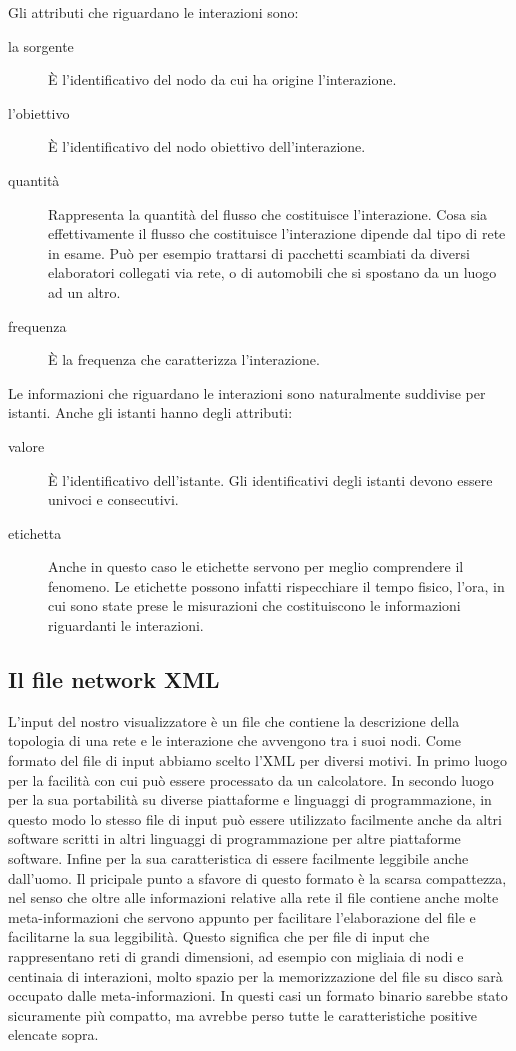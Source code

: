 \documentclass[a4paper,12pt]{article}
\begin{document}
Gli attributi che riguardano le interazioni sono:
\begin{description}
 \item[la sorgente] \`E l'identificativo del nodo da cui ha origine l'interazione.
 \item[l'obiettivo] \`E l'identificativo del nodo obiettivo dell'interazione.
 \item[quantità] Rappresenta la quantità del flusso che costituisce l'interazione. Cosa sia effettivamente il flusso che costituisce l'interazione dipende dal tipo di rete in esame. Pu\`o per esempio trattarsi di pacchetti scambiati da diversi elaboratori collegati via rete, o di automobili che si spostano da un luogo ad un altro.
 \item[frequenza] \`E la frequenza che caratterizza l'interazione.
\end{description}

Le informazioni che riguardano le interazioni sono naturalmente suddivise per istanti. Anche gli istanti hanno degli attributi:
\begin{description}
 \item[valore] \`E l'identificativo dell'istante. Gli identificativi degli istanti devono essere univoci e consecutivi.
 \item[etichetta] Anche in questo caso le etichette servono per meglio comprendere il fenomeno. Le etichette possono infatti rispecchiare il tempo fisico, l'ora, in cui sono state prese le misurazioni che costituiscono le informazioni riguardanti le interazioni.
\end{description}
 
\subsection{Il file network XML}
 
L'input del nostro visualizzatore \`e un file che contiene la descrizione della topologia di una rete e le interazione che avvengono tra i suoi nodi. Come formato del file di input abbiamo scelto l'XML per diversi motivi. In primo luogo per la facilità con cui pu\`o essere processato da un calcolatore. In secondo luogo per la sua portabilità su diverse piattaforme e linguaggi di programmazione, in questo modo lo stesso file di input pu\`o essere utilizzato facilmente anche da altri software scritti in altri linguaggi di programmazione per altre piattaforme software. Infine per la sua caratteristica di essere facilmente leggibile anche dall'uomo.
Il pricipale punto a sfavore di questo formato \`e la scarsa compattezza, nel senso che oltre alle informazioni relative alla rete il file contiene anche molte meta-informazioni che servono appunto per facilitare l'elaborazione del file e facilitarne la sua leggibilità. Questo significa che per file di input che rappresentano reti di grandi dimensioni, ad esempio con migliaia di nodi e centinaia di interazioni, molto spazio per la memorizzazione del file su disco sarà occupato dalle meta-informazioni. In questi casi un formato binario sarebbe stato sicuramente più compatto, ma avrebbe perso tutte le caratteristiche positive elencate sopra.
 
\end{document}
